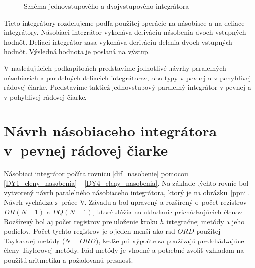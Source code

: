 \begin{figure}[H]
\centering
{} \hspace{1.0cm}
\label{schema_i_ndi}
\caption{Schéma jednovstupového a dvojvstupového integrátora}
\end{figure}

Tieto integrátory rozdeľujeme podľa použitej operácie na násobiace a na deliace integrátory. Násobiaci integrátor vykonáva deriváciu násobenia dvoch vstupných hodnôt. Deliaci integrátor zasa vykonáva deriváciu delenia dvoch vstupných hodnôt. Výsledná hodnota je poslaná na výstup.

V nasledujúcich podkapitolách predstavíme jednotlivé návrhy paralelných násobiacich a paralelných deliacich integrátorov, oba typy v pevnej a v pohyblivej rádovej čiarke. Predstavíme taktiež jednovstupový paralelný integrátor v pevnej a v pohyblivej rádovej čiarke.
\bigskip


\section{Návrh násobiaceho integrátora v~pevnej rádovej čiarke}
Násobiaci integrátor počíta rovnicu \eqref{dif_nasobenie} pomocou \eqref{DY1_cleny_nasobenia} -- \eqref{DY4_cleny_nasobenia}. Na základe týchto rovníc bol vytvorený návrh paralelného násobiaceho integrátora, ktorý je na obrázku~\ref{ppni}. Návrh vychádza z~práce V. Závadu \cite{ZavadaBP} a bol upravený a rozšírený o~počet registrov $ DR(N-1) $ a $ DQ(N-1) $, ktoré slúžia na ukladanie prichádzajúcich členov. Rozšírený bol aj počet registrov pre uloženie kroku $ h $ integračnej metódy a jeho podielov. Počet týchto registrov je o jeden menší ako rád $ ORD $ použitej Taylorovej metódy ($ N = ORD $), keďže pri výpočte sa používajú predchádzajúce členy Taylorovej metódy. Rád metódy je vhodné a potrebné zvoliť vzhľadom na použitú aritmetiku a požadovanú presnosť.

